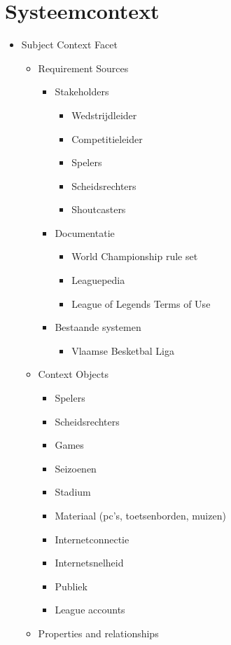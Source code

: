 \documentclass[12pt,a4paper]{article}
\begin{document}
	\section{Systeemcontext}
		\begin{itemize}
			\item Subject Context Facet
			\begin{itemize}
				\item Requirement Sources
				\begin{itemize}
					\item Stakeholders
					\begin{itemize}
						\item Wedstrijdleider
						\item Competitieleider
						\item Spelers
						\item Scheidsrechters
						\item Shoutcasters
					\end{itemize}
					\item Documentatie
					\begin{itemize}
						\item World Championship rule set
						\item Leaguepedia
						\item League of Legends Terms of Use
					\end{itemize}
					\item Bestaande systemen
					\begin{itemize}
						\item Vlaamse Besketbal Liga
					\end{itemize}
				\end{itemize}
				\item Context Objects
				\begin{itemize}
					\item Spelers
					\item Scheidsrechters
					\item Games
					\item Seizoenen
					\item Stadium
					\item Materiaal (pc's, toetsenborden, muizen)
					\item Internetconnectie
					\item Internetsnelheid
					\item Publiek
					\item League accounts
				\end{itemize}
				\item Properties and relationships

\end{itemize}
\end{itemize}
\end{document}
